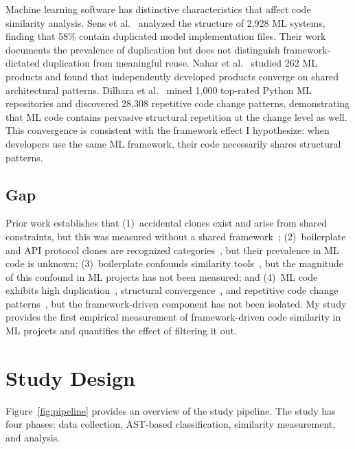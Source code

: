 \documentclass[smallextended,natbib]{svjour3}
\begin{document}
Machine learning software has distinctive characteristics that affect code similarity analysis. Sens et al.~\citep{sens2025} analyzed the structure of 2,928 ML systems, finding that 58\% contain duplicated model implementation files. Their work documents the prevalence of duplication but does not distinguish framework-dictated duplication from meaningful reuse. Nahar et al.~\citep{nahar2023} studied 262 ML products and found that independently developed products converge on shared architectural patterns. Dilhara et al.~\citep{dilhara2022} mined 1,000 top-rated Python ML repositories and discovered 28,308 repetitive code change patterns, demonstrating that ML code contains pervasive structural repetition at the change level as well. This convergence is consistent with the framework effect I hypothesize: when developers use the same ML framework, their code necessarily shares structural patterns.

\subsection{Gap}

Prior work establishes that (1)~accidental clones exist and arise from shared constraints, but this was measured without a shared framework~\citep{juergens2010}; (2)~boilerplate and API protocol clones are recognized categories~\citep{kapser2008}, but their prevalence in ML code is unknown; (3)~boilerplate confounds similarity tools~\citep{ragkhitwetsagul2018}, but the magnitude of this confound in ML projects has not been measured; and (4)~ML code exhibits high duplication~\citep{sens2025}, structural convergence~\citep{nahar2023}, and repetitive code change patterns~\citep{dilhara2022}, but the framework-driven component has not been isolated. My study provides the first empirical measurement of framework-driven code similarity in ML projects and quantifies the effect of filtering it out.


\section{Study Design}
\label{sec:method}

Figure~\ref{fig:pipeline} provides an overview of the study pipeline. The study has four phases: data collection, AST-based classification, similarity measurement, and analysis.
\end{document}
